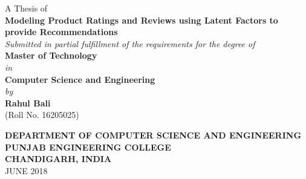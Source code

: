 \documentclass[12pt,a4paper]{memoir}
\begin{document}
%
%

\thispagestyle{empty}
{\centering
    {{A Thesis of}\\}
    \vspace{0.1cm}
    {\Large\textbf{Modeling Product Ratings and Reviews using Latent Factors to provide Recommendations}\\}
    \vspace{1cm}
    {\textit{Submitted in partial fulfillment of the requirements for the degree of}\\}
    \vspace{0.5cm}
    {\textbf{Master of Technology}}
    \\\textit{in}
    \\{\textbf{Computer Science and Engineering}}
    \vspace{1cm}
    \\{\textit{by}}\\
    \vspace{0.2cm}
    {\large \textbf{Rahul Bali}} \\ (Roll No. 16205025)\\
    \vspace{1.5cm}
    \vspace {0.7cm}
    \begin{figure}[h]
        {\par}
    \end{figure}
    \vspace{0.5cm}
    {\normalsize{\textbf{DEPARTMENT OF COMPUTER SCIENCE AND ENGINEERING}}}\\
    \vspace{0.3cm}
    {\textbf{PUNJAB ENGINEERING COLLEGE\\}}
    {\textbf{CHANDIGARH, INDIA\\}}
    \vspace{.2 cm}
    {JUNE 2018}\\
}
\end{document}
